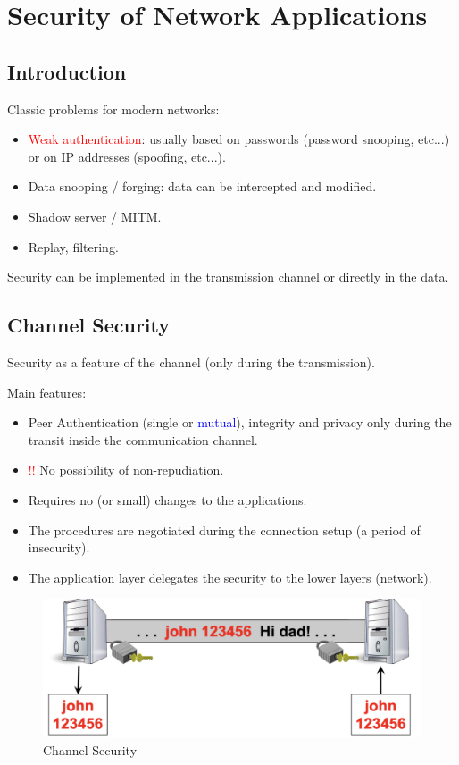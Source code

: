 \chapter{Security of Network Applications}

\cite{06_appsec}
\section*{Introduction}
Classic problems for modern networks:
\begin{itemize}
    \item \textcolor{Red}{Weak authentication}: usually based on passwords (password snooping, etc...) or on IP addresses (spoofing, etc...). 
    \item Data snooping / forging: data can be intercepted and modified.
    \item Shadow server / MITM.
    \item Replay, filtering. 
\end{itemize}

Security can be implemented in the transmission channel or directly in the data.

\section{Channel Security}
\begin{center}
    Security as a feature of the channel (only during the transmission).
\end{center}




\begin{multicols}{2}
    Main features:
    \begin{itemize}
        \item Peer Authentication (single or \textcolor{Blue}{mutual}), integrity and privacy only during the transit inside the communication channel.
        \item \textcolor{Red}{!!} No possibility of non-repudiation.
        \item Requires no (or small) changes to the applications.
        \item The procedures are negotiated during the connection setup (a period of insecurity).
        \item The application layer delegates the security to the lower layers (network).
    \end{itemize}
\columnbreak

\begin{figure}[H]
    \centering
    \includegraphics[width=\linewidth]{Images/Appsec/channel_security.png}
    \caption{Channel Security}
\end{figure}
\end{multicols}

